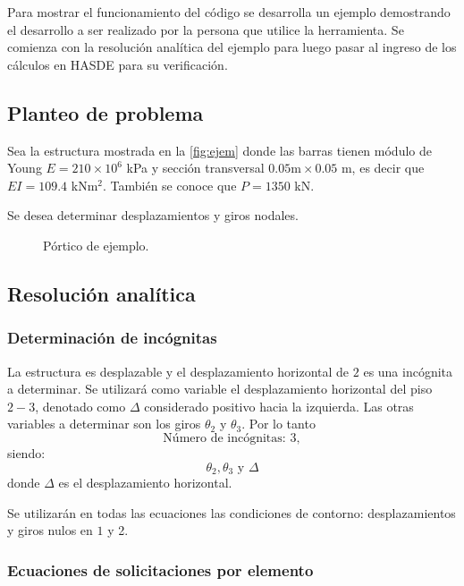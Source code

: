 Para mostrar el funcionamiento del código se desarrolla un ejemplo demostrando el desarrollo a ser realizado por la persona que utilice la herramienta. Se comienza con la resolución analítica del ejemplo para luego pasar al ingreso de los cálculos en HASDE para su verificación.

\subsection{Planteo de problema}

Sea la estructura mostrada en la \autoref{fig:ejem} donde las barras tienen módulo de Young $E=210 \times 10^{6}$ kPa y sección transversal $0.05 \text{m} \times 0.05$ m, es decir que $EI=109.4 $ kNm$^2$. %
También se conoce que $P = 1350$ kN.



Se desea determinar desplazamientos y giros nodales. %

\begin{figure}[htb]
	\centering
	\def\svgwidth{0.5\textwidth}
	
	\caption{Pórtico de ejemplo.}
	\label{fig:ejem}
\end{figure}

\subsection{Resolución analítica}


\subsubsection{Determinación de incógnitas}
La estructura es desplazable y el desplazamiento horizontal de $2$ es una incógnita a determinar. %
%
Se utilizará como variable el desplazamiento horizontal del piso $2-3$, denotado como $\Delta$ considerado positivo hacia la izquierda. %
%
Las otras variables a determinar son los giros $\theta_2$ y $\theta_3$. %
Por lo tanto 
$$
\boxed{\text{Número de incógnitas: } 3},
$$
siendo:
$$
\boxed{
 \theta_2, \theta_3 \text{ y } \Delta}
$$
donde $\Delta$ es el desplazamiento horizontal.


Se utilizarán en todas las ecuaciones las condiciones de contorno: desplazamientos y giros nulos en $1$ y 2.


\subsubsection{Ecuaciones de solicitaciones por elemento}


